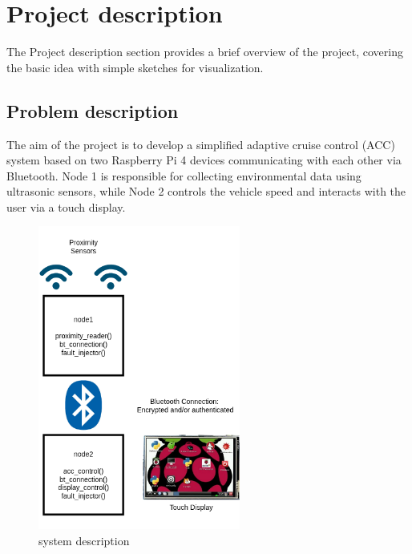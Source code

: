 \section{Project description}
\label{chapter1}

The Project description section provides a brief overview of the project, covering the basic idea with simple sketches for visualization.

\subsection{Problem description}


The aim of the project is to develop a simplified adaptive cruise control (ACC) system based on two Raspberry Pi 4 devices communicating with each other via Bluetooth. Node 1 is responsible for collecting environmental data using ultrasonic sensors, while Node 2 controls the vehicle speed and interacts with the user via a touch display.

\begin{figure}[h]
	\includegraphics[height=100mm]{images/system}
	\centering
	\caption{system description}
	\label{fig:system}
\end{figure}

\paragraph{}


